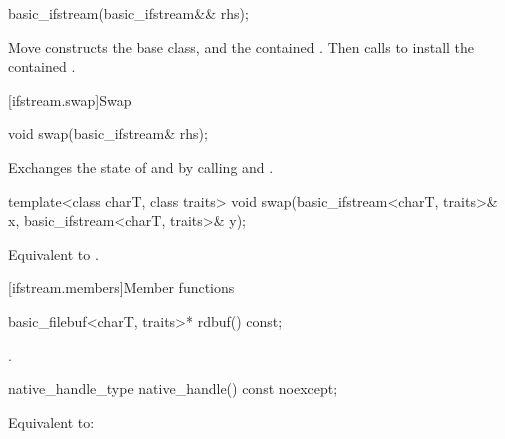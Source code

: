 %
\begin{itemdecl}
basic_ifstream(basic_ifstream&& rhs);
\end{itemdecl}

\begin{itemdescr}
\pnum
\effects
Move constructs the base class, and the contained .
Then calls 
to install the contained .
\end{itemdescr}

[ifstream.swap]{Swap}

%
\begin{itemdecl}
void swap(basic_ifstream& rhs);
\end{itemdecl}

\begin{itemdescr}
\pnum
\effects
Exchanges the state of 
and  by calling
 and
.
\end{itemdescr}

%
\begin{itemdecl}
template<class charT, class traits>
  void swap(basic_ifstream<charT, traits>& x, basic_ifstream<charT, traits>& y);
\end{itemdecl}

\begin{itemdescr}
\pnum
\effects
Equivalent to .
\end{itemdescr}

[ifstream.members]{Member functions}

%
\begin{itemdecl}
basic_filebuf<charT, traits>* rdbuf() const;
\end{itemdecl}

\begin{itemdescr}
\pnum
\returns
{}.
\end{itemdescr}

%
\begin{itemdecl}
native_handle_type native_handle() const noexcept;
\end{itemdecl}

\begin{itemdescr}
\pnum
\effects
Equivalent to: 
\end{itemdescr}

